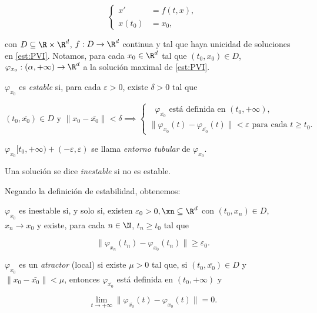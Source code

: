 \begin{equation}
\left\{\begin{array}{rl}
x' &=f(t,x), \\
x(t_0)&=x_0,
\end{array}\right.
\tag{P} \label{est:PVI}
\end{equation}

con $D \subseteq \R \times \R^d$, $f: D \to \R^d$ continua y tal que haya unicidad de soluciones en \ref{est:PVI}.
Notamos, para cada $x_0\in \R^d$ tal que $(t_0,x_0) \in D$, $\varphi_{x_0} : (\alpha, +\infty) \to \R^d$ a la solución maximal de \ref{est:PVI}.

\begin{ndef}
  $\varphi_{x_0}$ es \emph{estable} si, para cada $\varepsilon > 0$, existe $\delta > 0$ tal que

  \[
    (t_0, \bar{x_0}) \in D \text{ y } \|x_0 - \bar{x_0}\| < \delta \implies
  \begin{cases}
    \text{ $\varphi_{\bar{x_0}}$ está definida en $(t_0, +\infty)$}, \\
    \|\varphi_{x_0}(t) - \varphi_{\bar{x_0}}(t)\| < \varepsilon \text{ para cada $t \ge t_0$}.
  \end{cases}
  \]

  $\varphi_{x_0}[t_0, +\infty)+(-\varepsilon, \varepsilon)$ se llama \emph{entorno tubular} de $\varphi_{x_0}$.
\end{ndef}

\begin{ndef}
  Una solución se dice \emph{inestable} si no es estable.
\end{ndef}


Negando la definición de estabilidad, obtenemos:

\begin{nprop}
  $\varphi_{x_0}$ es inestable si, y solo si, existen $\varepsilon_0 > 0, \xn \subseteq\R^d$ con
  $(t_0,x_n)\in D$, $x_n \to x_0$ y existe, para cada $n\in\N$, $t_n \ge t_0$ tal que

  \[
    \| \varphi_{x_n}(t_n) - \varphi_{x_0}(t_n) \| \ge \varepsilon_0
  .\]
\end{nprop}

\begin{ndef}[Atractor]
  $\varphi_{x_0}$ es un \emph{atractor} (local) si existe $\mu > 0$ tal que, si $(t_0, \bar{x_0})\in D$
  y $\| x_0 - \bar{x_0} \| < \mu$, entonces $\varphi_{\bar{x_0}}$ está definida en $(t_0, +\infty)$ y

  \[
     \lim_{t\to+\infty} \| \varphi_{\bar{x_0}}(t) - \varphi_{x_0}(t) \| = 0.
  \]
\end{ndef}

